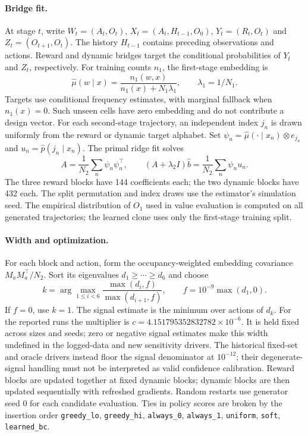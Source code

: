 \documentclass[11pt]{article}
\begin{document}
\paragraph{Bridge fit.}
At stage $t$, write $W_t=(A_t,O_t)$,
$X_t=(A_t,H_{t-1},O_0)$, $Y_t=(R_t,O_t)$ and
$Z_t=(O_{t+1},O_t)$. The history $H_{t-1}$ contains preceding observations and
actions. Reward and dynamic bridges target the conditional probabilities of
$Y_t$ and $Z_t$, respectively. For training counts $n_1$, the first-stage
embedding is
\[
 \hat\mu(w\mid x)=\frac{n_1(w,x)}{n_1(x)+N_1\lambda_1},
 \qquad \lambda_1=1/N_1.
\]
Targets use conditional frequency estimates, with marginal fallback when
$n_1(x)=0$. Such unseen cells have zero embedding and do not contribute a
design vector. For each second-stage trajectory, an independent index $j_n$
is drawn uniformly from the reward or dynamic target alphabet. Set
$\psi_n=\hat\mu(\cdot\mid x_n)\otimes e_{j_n}$ and
$u_n=\hat p(j_n\mid x_n)$. The primal ridge fit solves
\[
 A=\frac1{N_2}\sum_n\psi_n\psi_n^\top,\qquad
 (A+\lambda_2 I)\hat b=\frac1{N_2}\sum_n\psi_n u_n.
\]
The three reward blocks have 144 coefficients each; the two dynamic blocks
have 432 each. The split permutation and index draws use the estimator's
simulation seed. The empirical distribution of $O_1$ used in value evaluation
is computed on all generated trajectories; the learned clone uses only the
first-stage training split.

\paragraph{Width and optimization.}
For each block and action, form the occupancy-weighted embedding covariance
$M_aM_a^\top/N_2$. Sort its eigenvalues $d_1\ge\cdots\ge d_6$ and choose
\[
 k=\arg\max_{1\le i<6}\frac{\max(d_i,f)}{\max(d_{i+1},f)},
 \qquad f=10^{-9}\max(d_1,0).
\]
If $f=0$, use $k=1$.
The signal estimate is the minimum over actions of $d_k$.
For the reported runs the multiplier is $c=4.151795352832782\times10^{-6}$.
It is held fixed across sizes and seeds; zero or negative signal estimates
make this width undefined in the logged-data and new sensitivity drivers.
The historical fixed-set and oracle drivers instead floor the signal
denominator at $10^{-12}$; their degenerate-signal handling must not be
interpreted as valid confidence calibration.
Reward blocks are updated together at fixed dynamic blocks; dynamic blocks
are then updated sequentially with refreshed gradients. Random restarts use
generator seed 0 for each candidate evaluation. Ties in policy scores are
broken by the insertion order
\texttt{greedy\_lo}, \texttt{greedy\_hi}, \texttt{always\_0},
\texttt{always\_1}, \texttt{uniform}, \texttt{soft}, \texttt{learned\_bc}.
\end{document}
